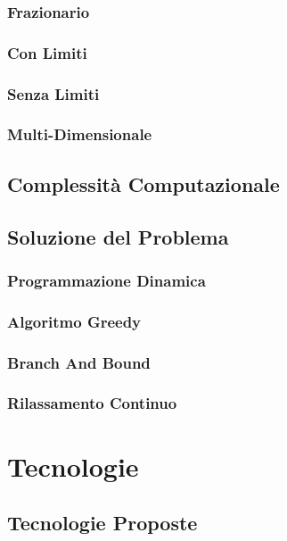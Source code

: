 \documentclass[a4paper,12pt]{report}
\begin{document}
\subsection{Frazionario}
%
\subsection{Con Limiti}
%
\subsection{Senza Limiti}
%
\subsection{Multi-Dimensionale}
%
\section{Complessità Computazionale}
%
\section{Soluzione del Problema}
%
\subsection{Programmazione Dinamica}
%
\subsection{Algoritmo Greedy}
%
\subsection{Branch And Bound}
%
\subsection{Rilassamento Continuo}
%
\chapter{Tecnologie}
%
\section{Tecnologie Proposte}
%
\end{document}
